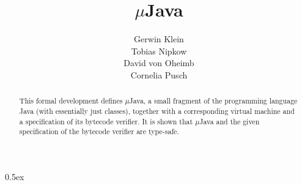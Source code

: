 \documentclass[11pt,a4paper]{article}
\newcommand{\mJava}{$\mu$Java}
\begin{document}
\title{\mJava}
\author{Gerwin Klein \\ Tobias Nipkow \\ David von Oheimb \\ Cornelia Pusch}
\maketitle

\begin{abstract}
  This formal development defines {\mJava}, a small fragment of the
  programming language Java (with essentially just classes), together with a
  corresponding virtual machine and a specification of its bytecode verifier.
  It is shown that {\mJava} and the given specification of the bytecode
  verifier are type-safe.
\end{abstract}

\tableofcontents
\parindent 0pt \parskip 0.5ex

\newpage


\nocite{*}


\end{document}
